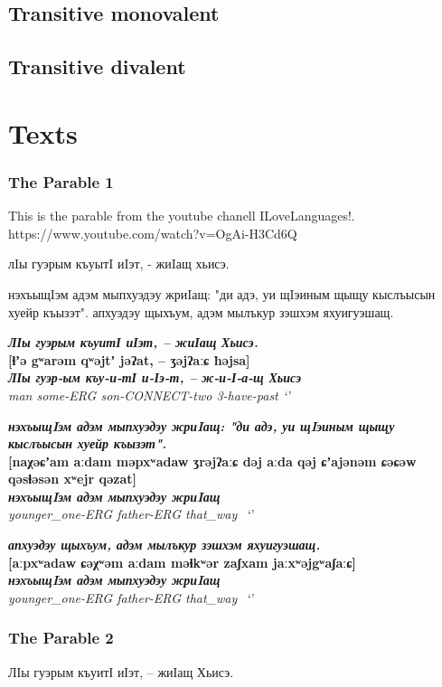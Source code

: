 \documentclass[a4paper,12pt]{book}
\newcommand{\1}[1]{\textbf{\emph{#1}}} %
\newcommand{\2}[1]{\textbf{[#1]}} %
\newcommand{\3}[1]{\fontsize{11pt}{0cm}\textbf{\emph{#1}}} %
\newcommand{\4}[1]{\fontsize{10pt}{0cm}\emph{#1}}	%
\newcommand{\5}[1]{\textbf{/#1/}} %
\newcommand{\6}[1]{\textbf{[#1]}} %
\newcommand{\7}[1]{\fontsize{12pt}{0cm}\emph{#1}} %
\newcommand{\8}[1]{\fontsize{12pt}{0cm}`#1'} %
\newcommand{\9}[1]{\fontsize{12pt}{0cm}(lit. `#1')} %
\begin{document}
\section{Transitive monovalent}
\section{Transitive divalent}
\chapter{Texts}
\subsection{The Parable 1}
This is the parable from the youtube chanell ILoveLanguages!. https://www.youtube.com/watch?v=OgAi-H3Cd6Q

лIы гуэрым къуытI иIэт, - жиIащ хьисэ.

нэхъыщIэм адэм мыпхуэдэу жриIащ: "ди адэ, уи щIэиным щыщу кыслъысын хуейр къызэт". апхуэдэу щыхъум, адэм мылъкур зэшхэм яхуигуэшащ.


\begin{exe}
\ex
\1{ЛӀы гуэрым къуитӀ иӀэт, – жиӀащ Хьисэ.}\\
\2{ɬʼə gʷarəm qʷəjtʼ jəʔat, – ʒəjʔaːɕ ħəjsa}\\
\3{ЛӀы гуэр-ым къу-и-тӀ и-Ӏэ-т, – ж-и-Ӏ-а-щ Хьисэ}\\
\4{man some-ERG son-CONNECT-two 3-have-past}\
\trans \8{}

\ex
\1{нэхъыщIэм адэм мыпхуэдэу жриIащ: "ди адэ, уи щIэиным щыщу кыслъысын хуейр къызэт". }\\
\2{naχəɕʼam aːdam məpxʷadaw ʒrəjʔaːɕ dəj aːda qəj ɕʼajənəm ɕəɕəw qəsɬəsən xʷejr qəzat}\\
\3{нэхъыщIэм адэм мыпхуэдэу жриIащ}\\
\4{younger_one-ERG father-ERG that_way }\
\trans \8{}

\ex
\1{апхуэдэу щыхъум, адэм мылъкур зэшхэм яхуигуэшащ.}\\
\2{aːpxʷadaw ɕəχʷəm aːdam məɬkʷər zaʃxam jaːxʷəjgʷaʃaːɕ}\\
\3{нэхъыщIэм адэм мыпхуэдэу жриIащ}\\
\4{younger_one-ERG father-ERG that_way }\
\trans \8{}
\end{exe}



\subsection{The Parable 2}
ЛӀы гуэрым къуитӀ иӀэт, – жиӀащ Хьисэ. 
\end{document}
